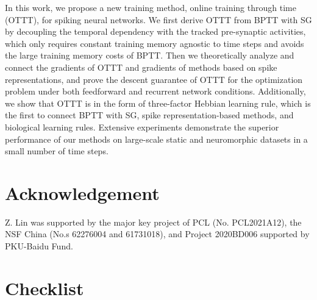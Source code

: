 \documentclass{article}
\begin{document}
In this work, we propose a new training method, online training through time (OTTT), for spiking neural networks. We first derive OTTT from BPTT with SG by decoupling the temporal dependency with the tracked pre-synaptic activities, which only requires constant training memory agnostic to time steps and avoids the large training memory costs of BPTT. Then we theoretically analyze and connect the gradients of OTTT and gradients of methods based on spike representations, and prove the descent guarantee of OTTT for the optimization problem under both feedforward and recurrent network conditions. Additionally, we show that OTTT is in the form of three-factor Hebbian learning rule, which is the first to connect BPTT with SG, spike representation-based methods, and biological learning rules. Extensive experiments demonstrate the superior performance of our methods on large-scale static and neuromorphic datasets in a small number of time steps.

\section*{Acknowledgement} 
Z. Lin was supported by the major key project of PCL (No. PCL2021A12), the NSF China (No.s 62276004 and 61731018), and Project 2020BD006 supported by PKU-Baidu Fund.

\small



\section*{Checklist}
\end{document}
